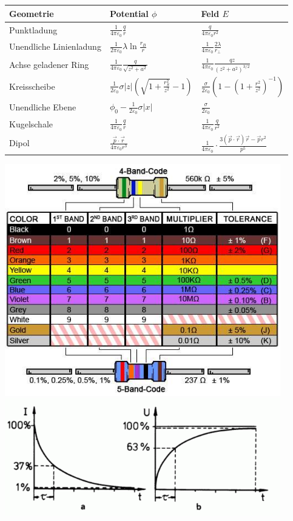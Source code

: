 \documentclass[12pt,a4paper, twoside]{article}
\newcommand{\abs}[1]{\left| #1 \right|}
\renewcommand{\=}[1]{\stackrel{#1}{=}}
\theoremstyle{definition}
\theoremstyle{remark}
\begin{document}
\begin{center}
\begin{framed}
	\noindent \begin{tabular}{lll}
	Geometrie & Potential $\phi$ & Feld $E$\\
	\midrule
	Punktladung & $\frac{1}{4\pi\varepsilon_0} \frac{q}{r}$ & $\frac{q}{4\pi \varepsilon_0 r^2}$\\
	Unendliche Linienladung & $\frac{1}{2\pi\varepsilon_0} \lambda \ln\frac{r_B}{r}$ & $\frac{1}{4\pi\varepsilon_0} \frac{2\lambda}{r_{\perp}}$\\
	Achse geladener Ring & $\frac{1}{4\pi\varepsilon_0} \frac{q}{\sqrt{z^2 + a^2 }}$ & $\frac{1}{4\pi\varepsilon_0} \frac{qz}{(z^2 +a^2)^{3/2}}$\\
	Kreisscheibe & $\frac{1}{2 \varepsilon_0} \sigma \abs{z} (\sqrt{1+\frac{r_S^2}{z^2}}-1)$ & $\frac{\sigma}{2 \varepsilon_0} (1-(1+\frac{r^2}{z^2})^{-1})$\\
	Unendliche Ebene & $\phi_0 - \frac{1}{2\varepsilon_0} \sigma \abs{x}$ & $\frac{\sigma}{2 \varepsilon_0}$\\
	Kugelschale & $\frac{1}{4\pi\varepsilon_0} \frac{q}{r}$ & $\frac{1}{4\pi\varepsilon_0}\frac{q}{r^2}$\\
	Dipol & $\frac{\vec p \cdot \vec r}{4\pi \varepsilon_0 r^3}$ & $\frac{1}{4\pi \varepsilon_0} \cdot \frac{3(\vec p \cdot \vec r)\vec r - \vec p r^2}{p^5}$
	\end{tabular}
\end{framed}
\end{center}

\newpage
\includegraphics[width=0.9\textwidth]{pic/resistors.jpg}\\
\includegraphics[width=0.9\textwidth]{pic/kondensator-aufladung.png}
\end{document}
